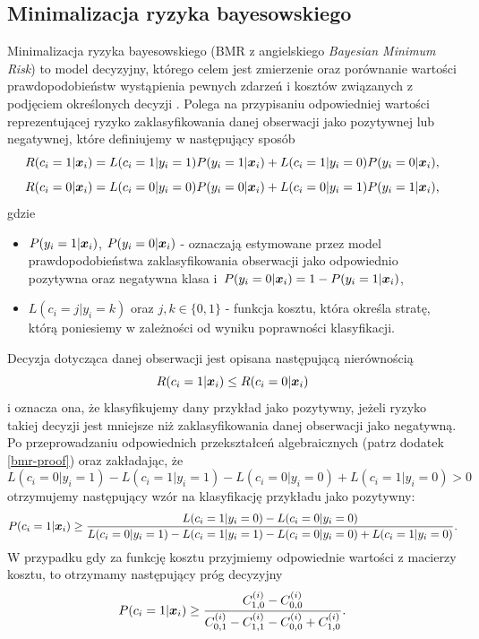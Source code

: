 \documentclass[inzynierska]{pwr_wmat_praca_dyplomowa}
\theoremstyle{plain}
\numberwithin{theorem}{chapter}
\theoremstyle{definition}
\numberwithin{theorem}{chapter}
\begin{document}
\subsection{Minimalizacja ryzyka bayesowskiego}
\label{bmr}
Minimalizacja ryzyka bayesowskiego (BMR z angielskiego \textit{Bayesian Minimum Risk}) to model decyzyjny, którego celem jest zmierzenie oraz porównanie wartości prawdopodobieństw wystąpienia pewnych zdarzeń i kosztów związanych z podjęciem określonych decyzji  \cite{CSCCFD}. Polega na przypisaniu odpowiedniej wartości reprezentującej ryzyko zaklasyfikowania danej obserwacji jako pozytywnej lub negatywnej, które definiujemy w następujący sposób
$$ R(c_i = 1|\boldsymbol{x}_{i}) = L(c_i = 1|y_i = 1)P(y_i = 1|\boldsymbol{x}_{i}) + L(c_i = 1|y_i = 0)P(y_i = 0|\boldsymbol{x}_{i}) \text{,}$$
$$ R(c_i = 0|\boldsymbol{x}_{i}) = L(c_i = 0|y_i = 0)P(y_i = 0|\boldsymbol{x}_{i}) + L(c_i = 0|y_i = 1)P(y_i = 1|\boldsymbol{x}_{i}) \text{,}$$
gdzie
\begin{itemize}
	\item $P(y_i = 1|\boldsymbol{x}_{i})$, $P(y_i = 0|\boldsymbol{x}_{i})$ - oznaczają estymowane przez model prawdopodobieństwa zaklasyfikowania obserwacji jako odpowiednio pozytywna oraz negatywna klasa i~$P(y_i = 0|\boldsymbol{x}_{i}) = 1 - P(y_i = 1|\boldsymbol{x}_{i})$,
	\item $L(c_i = j|y_i = k)$ oraz $j,k \in \{0, 1\}$ - funkcja kosztu, która określa stratę, którą poniesiemy w zależności od wyniku poprawności klasyfikacji.
\end{itemize}{}
Decyzja dotycząca danej obserwacji jest opisana następującą nierównością
$$ R(c_i = 1|\boldsymbol{x}_{i}) \leq R(c_i = 0|\boldsymbol{x}_{i})$$
i oznacza ona, że klasyfikujemy dany przykład jako pozytywny, jeżeli ryzyko takiej decyzji jest mniejsze niż zaklasyfikowania danej obserwacji jako negatywną. 
Po przeprowadzaniu odpowiednich przekształceń algebraicznych (patrz dodatek \ref{bmr-proof}) oraz zakładając, że 
$$ L(c_i = 0|y_i = 1) - L(c_i = 1|y_i = 1) - L(c_i = 0|y_i = 0) + L(c_i = 1|y_i = 0) > 0 $$ 
otrzymujemy następujący wzór na klasyfikację przykładu jako pozytywny:
$$ P(c_i = 1|\boldsymbol{x}_{i}) \ge \frac{L(c_i = 1|y_i = 0) - L(c_i = 0|y_i = 0)}{L(c_i = 0|y_i = 1) - L(c_i = 1|y_i = 1) - L(c_i = 0|y_i = 0) + L(c_i = 1|y_i = 0)} \text{.}$$
W przypadku gdy za funkcję kosztu przyjmiemy odpowiednie wartości z macierzy kosztu, to otrzymamy następujący próg decyzyjny
$$ P(c_i = 1|\boldsymbol{x}_{i}) \ge \frac{C^{(i)}_{1,0} - C^{(i)}_{0,0}}{C^{(i)}_{0,1} - C^{(i)}_{1,1} - C^{(i)}_{0,0} + C^{(i)}_{1,0}} \text{.}$$
\end{document}
